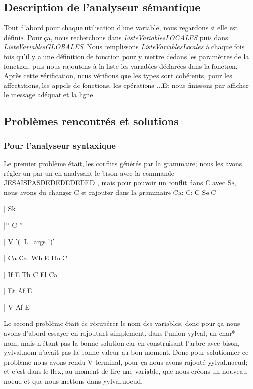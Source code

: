 ﻿\documentclass[10pt,a4paper]{article}
\begin{document}
\subsection{Description de l'analyseur sémantique}
Tout d'abord pour chaque utilisation d'une variable, nous regardons si elle est définie. Pour ça, nous recherchons dans \textit{ListeVariablesLOCALES} puis dans \textit{ListeVariablesGLOBALES}. Nous remplissons \textit{ListeVariablesLocales} à chaque fois fois qu'il y a une définition de fonction pour y mettre dedans les paramètres de la fonction; puis nous rajoutons à la liste les variables déclarées dans la fonction.
Après cette vérification, nous vérifions que les types sont cohérents, pour les affectations, les appels de fonctions, les opérations ...Et nous finissons par afficher le message adéquat et la ligne.

\subsection{Problèmes rencontrés et solutions}
\subsubsection {Pour l'analyseur syntaxique}
Le premier problème était, les conflits générés par la grammaire; nous les avons régler un par un en analysant le bison avec la commande JESAISPASDEDEDEDEDED , mais pour pouvoir un conflit dans C avec Se, nous avons du changer C et rajouter dans la grammaire Ca:\newline 
C: C Se C

	| Sk
    
	|'{' C '}'
    
	| V '(' L\_args ')'
    
	| Ca\newline\newline
Ca: Wh E Do C

	| If E Th C El Ca
    
	| Et Af E
    
	| V Af E

Le second problème était de récupérer le nom des variables, donc pour ça nous avons d'abord essayer en rajoutant simplement, dans l'union yylval, un char* nom, mais n'étant pas la bonne solution car en construisant l'arbre avec bison, yylval.nom n'avait pas la bonne valeur au bon moment. Donc pour solutionner ce problème nous avons rendu V terminal, pour ça nous avons rajouté yylval.noeud; et c'est dans le flex, au moment de lire une variable, que nous créons un nouveau noeud et que nous mettons dans yylval.noeud.
\end{document}

